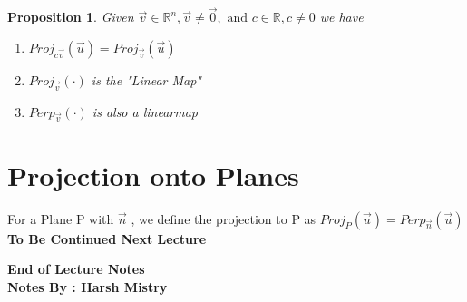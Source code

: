 \documentclass{article}
\newtheorem{proposition}[theorem]{Proposition}
\begin{document}
\begin{proposition} Given \(\vec{v} \in \mathbb{R}^n , \vec{v} \neq \vec{0} , \text{ and } c\in \mathbb{R} , c \neq 0 \) we have 
\begin{enumerate}
\item  \( Proj_{c\vec{v}} ( \vec{u}) = Proj_{\vec{v}} ( \vec{u}) \)
\item \( Proj_{\vec{v}} (\cdot)\) is the "Linear Map"
\item \( Perp_{\vec{v}} (\cdot)\) is also a linearmap
\end{enumerate}
\end{proposition}

\section{Projection onto Planes}
For a Plane P with \( \vec{n} \) , we define the projection to P as \( Proj_P (\vec{u}) = Perp_{\vec{n}} ( \vec{u}) \)\\

\textbf{To Be Continued Next Lecture }

\begin{center}
\textbf{End of Lecture Notes} \\
\textbf{Notes By : Harsh Mistry}
\end{center}
\end{document}
